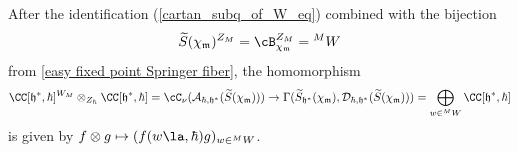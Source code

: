 \documentclass[12pt]{amsart}
\begin{document}
\begin{prop}\label{cartan_subq_w}
After the identification (\ref{cartan_subq_of_W_eq}) combined with the bijection 
\begin{equation*}
\widetilde{S}(\chi_{\mathfrak{m}})^{Z_M}=\cB_{\chi_{\mathfrak{m}}}^{Z_M}= {}^{M}W
\end{equation*}
from \cref{easy fixed point Springer fiber}, the homomorphism 
\begin{equation}\label{cartan_to_fixed_slodowy}
\CC[\mathfrak{h}^*,\hbar]^{W_M} \otimes_{Z_\hbar} \CC[\mathfrak{h}^*,\hbar] =\cC_\nu(\mathcal{A}_{\hbar,\mathfrak{h}^*}(\widetilde{S}(\chi_{\mathfrak{m}}))) \rightarrow \Gamma(\widetilde{S}_{\mathfrak{h}^*}(\chi_{\mathfrak{m}}),\mathcal{D}_{\hbar,\mathfrak{h}^*}(\widetilde{S}(\chi_{\mathfrak{m}})))=\bigoplus_{w \in {}^{M}W} \CC[\mathfrak{h}^*,\hbar]
\end{equation}
is given by $f \otimes g \mapsto (f(w\la,\hbar) g)_{w \in {}^MW}$.
\end{prop}
\end{document}
